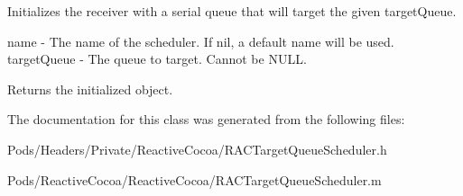 Initializes the receiver with a serial queue that will target the given {\ttfamily target\+Queue}.

name -\/ The name of the scheduler. If nil, a default name will be used. target\+Queue -\/ The queue to target. Cannot be N\+U\+LL.

Returns the initialized object. 

The documentation for this class was generated from the following files\+:\begin{DoxyCompactItemize}
\item 
Pods/\+Headers/\+Private/\+Reactive\+Cocoa/R\+A\+C\+Target\+Queue\+Scheduler.\+h\item 
Pods/\+Reactive\+Cocoa/\+Reactive\+Cocoa/R\+A\+C\+Target\+Queue\+Scheduler.\+m\end{DoxyCompactItemize}
